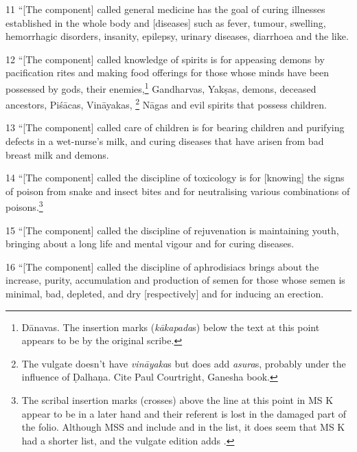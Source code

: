 \begin{translation}
    \item[11] “[The component] called general medicine has the goal of curing 
    illnesses established in the whole body and [diseases] such as fever, tumour, 
    swelling, hemorrhagic disorders, insanity, epilepsy, urinary diseases, diarrhoea 
    and the like.
    
    \item[12] “[The component] called knowledge of spirits is for appeasing
    demons by pacification rites and making food offerings for those whose
    minds have been possessed by gods, their enemies,\footnote{Dānavas.  The
    insertion marks (\emph{kākapada}s) below the text at this point appears to
    be by the original scribe.} Gandharvas, Yakṣas, demons, deceased
    ancestors, Piśācas, Vināyakas, \footnote{The vulgate doesn't have
    \emph{vināyaka}s but does add \emph{asura}s, probably under the influence
    of Ḍalhaṇa.  Cite Paul Courtright, Ganesha book.} Nāgas and evil spirits
    that possess children. %
    
    
    \item[13] “[The component] called care of children is for bearing children and 
    purifying defects in a wet-nurse's milk, and curing diseases that have arisen 
    from bad breast milk and demons.
    
    \item[14] “[The component] called the discipline of toxicology is for
    [knowing] the signs of poison from snake and insect bites and for
    neutralising various combinations of poisons.\footnote{The scribal
    insertion marks (crosses) above the line at this point in MS K appear to
    be in a later hand and their referent is lost in the damaged part of the
    folio.  Although MSS  and  include  and
     in the list, it does seem that MS K had
    a shorter list, and the vulgate edition adds .}
    
    \item[15] “[The component] called the discipline of rejuvenation is 
    maintaining 
    youth, bringing about a long life and mental vigour and for curing diseases.
    
    
    \item[16] “[The component] called the discipline of aphrodisiacs brings about 
    the 
    increase, purity, accumulation and  production of semen for those whose semen 
    is minimal, bad, depleted, and dry [respectively] and for inducing an erection.
    

\end{translation}
